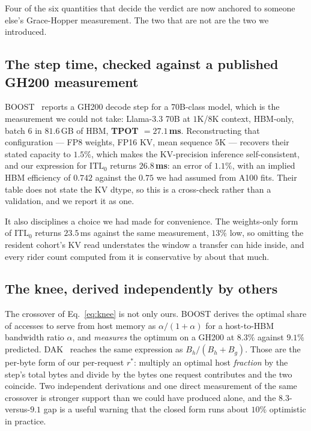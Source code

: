 Four of the six quantities that decide the verdict are now anchored to someone
else's Grace-Hopper measurement. The two that are not are the two we introduced.

\subsection{The step time, checked against a published GH200 measurement}
\label{app:validation:t0}

BOOST~\cite{boost} reports a GH200 decode step for a 70B-class model, which is the
measurement we could not take: Llama-3.3 70B at $1$K/$8$K context, HBM-only, batch
$6$ in $81.6$\,GB of HBM, \textbf{TPOT $= 27.1$\,ms}. Reconstructing that
configuration --- FP8 weights, FP16 KV, mean sequence $5$K --- recovers their stated
capacity to $1.5\%$, which makes the KV-precision inference self-consistent, and our
expression for $\mathrm{ITL}_0$ returns $\mathbf{26.8}$\,\textbf{ms}: an error of
$1.1\%$, with an implied HBM efficiency of $0.742$ against the $0.75$ we had assumed
from A100 fits. Their table does not state the KV dtype, so this is a cross-check
rather than a validation, and we report it as one.

It also disciplines a choice we had made for convenience. The weights-only form of
$\mathrm{ITL}_0$ returns $23.5$\,ms against the same measurement, $13\%$ low, so
omitting the resident cohort's KV read understates the window a transfer can hide
inside, and every rider count computed from it is conservative by about that much.

\subsection{The knee, derived independently by others}

The crossover of Eq.~\ref{eq:knee} is not only ours. BOOST derives the optimal share
of accesses to serve from host memory as $\alpha/(1{+}\alpha)$ for a host-to-HBM
bandwidth ratio $\alpha$, and \emph{measures} the optimum on a GH200 at $8.3\%$
against $9.1\%$ predicted. DAK~\cite{dak} reaches the same expression as
$B_h/(B_h + B_g)$. Those are the per-byte form of our per-request $r^{*}$: multiply
an optimal host \emph{fraction} by the step's total bytes and divide by the bytes one
request contributes and the two coincide. Two independent derivations and one direct
measurement of the same crossover is stronger support than we could have produced
alone, and the $8.3$-versus-$9.1$ gap is a useful warning that the closed form runs
about $10\%$ optimistic in practice.


